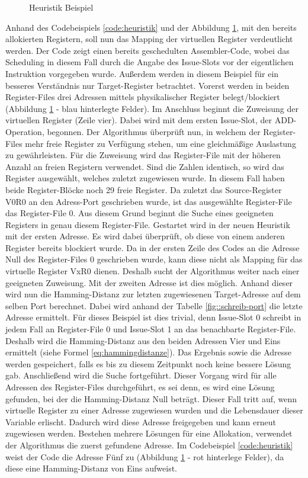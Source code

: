 \begin{figure}[H] 
	\centering
	
	\caption{Heuristik Beispiel}
	\label{fig:heuristik}
\end{figure}

Anhand des Codebeispiels \ref{code:heuristik} und der Abbildung \ref{fig:heuristik}, mit den bereits allokierten Registern, soll nun das Mapping der virtuellen Register verdeutlicht werden.
Der Code zeigt einen bereits geschedulten Assembler-Code, wobei das Scheduling in diesem Fall durch die Angabe des Issue-Slots vor der eigentlichen Instruktion vorgegeben wurde. Außerdem werden in diesem Beispiel für ein besseres Verständnis nur Target-Register betrachtet.
Vorerst werden in beiden Register-Files drei Adressen mittels physikalischer Register belegt/blockiert (Abbildung \ref{fig:heuristik} - blau hinterlegte Felder). Im Anschluss beginnt die Zuweisung der virtuellen Register (Zeile vier).
Dabei wird mit dem ersten Issue-Slot, der ADD-Operation, begonnen. Der Algorithmus überprüft nun, in welchem der Register-Files mehr freie Register zu Verfügung stehen, um eine gleichmäßige Auslastung zu gewährleisten. Für die Zuweisung wird das Register-File mit der höheren Anzahl an freien Registern verwendet. Sind die Zahlen identisch, so wird das Register ausgewählt, welches zuletzt zugewiesen wurde. In diesem Fall haben beide Register-Blöcke noch 29 freie Register. Da zuletzt das Source-Register V0R0 an den Adress-Port geschrieben wurde, ist das ausgewählte Register-File das Register-File 0.
Aus diesem Grund beginnt die Suche eines geeigneten Registers in genau diesem Register-File. Gestartet wird in der neuen Heuristik mit der ersten Adresse. Es wird dabei überprüft, ob diese von einem anderen Register bereits blockiert wurde. Da in der ersten Zeile des Codes an die Adresse Null des Register-Files 0 geschrieben wurde, kann diese nicht als Mapping für das virtuelle Register VxR0 dienen. Deshalb sucht der Algorithmus weiter nach einer geeigneten Zuweisung. Mit der zweiten Adresse ist dies möglich. Anhand dieser wird nun die Hamming-Distanz zur letzten zugewiesenen Target-Adresse auf dem selben Port berechnet. Dabei wird anhand der Tabelle \ref{fig::schreib-port} die letzte Adresse ermittelt. Für dieses Beispiel ist dies trivial, denn Issue-Slot 0 schreibt in jedem Fall an Register-File 0 und Issue-Slot 1 an das benachbarte Register-File. Deshalb wird die Hamming-Distanz aus den beiden Adressen Vier und Eins ermittelt (siehe Formel \ref{eq:hammingdistanze}). Das Ergebnis sowie die Adresse werden gespeichert, falls es bis zu diesem Zeitpunkt noch keine bessere Lösung gab. Anschließend wird die Suche fortgeführt. Dieser Vorgang wird für alle Adressen des Register-Files durchgeführt, es sei denn, es wird eine Lösung gefunden, bei der die Hamming-Distanz Null beträgt. Dieser Fall tritt auf, wenn virtuelle Register zu einer Adresse zugewiesen wurden und die Lebensdauer dieser Variable erlischt. Dadurch wird diese Adresse freigegeben und kann erneut zugewiesen werden.  Bestehen mehrere Lösungen für eine Allokation, verwendet der Algorithmus die zuerst gefundene Adresse. Im Codebeispiel \ref{code:heuristik} weist der Code die Adresse Fünf zu (Abbildung \ref{fig:heuristik} - rot hinterlege Felder), da diese eine Hamming-Distanz von Eins aufweist.
